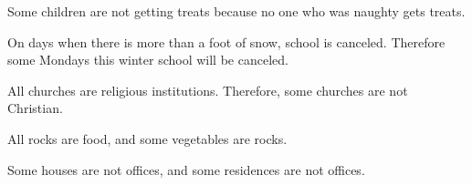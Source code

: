 \begin{exercises}
\item Some children are not getting treats because no one who was naughty gets treats.



\item On days when there is more than a foot of snow, school is canceled. Therefore some Mondays this winter school will be canceled.




\item All churches are religious institutions. Therefore, some churches are not Christian.

\item All rocks are food, and some vegetables are rocks.



\item Some houses are not offices, and some residences are not offices.
%


\end{exercises}
